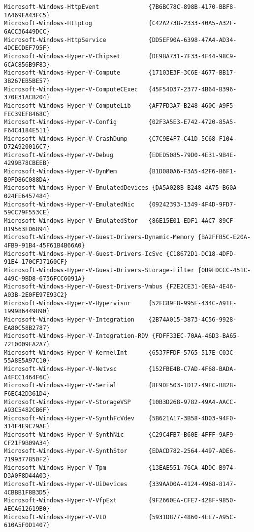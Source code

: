 \documentclass{report}
\begin{document}
\begin{lstlisting}[breaklines=true,basicstyle=\tiny]
Microsoft-Windows-HttpEvent              {7B6BC78C-898B-4170-BBF8-1A469EA43FC5}
Microsoft-Windows-HttpLog                {C42A2738-2333-40A5-A32F-6ACC36449DCC}
Microsoft-Windows-HttpService            {DD5EF90A-6398-47A4-AD34-4DCECDEF795F}
Microsoft-Windows-Hyper-V-Chipset        {DE9BA731-7F33-4F44-98C9-6CAC856B9F83}
Microsoft-Windows-Hyper-V-Compute        {17103E3F-3C6E-4677-BB17-3B267EB5BE57}
Microsoft-Windows-Hyper-V-ComputeCExec   {45F54D37-2377-4B64-B396-370E31ACB204}
Microsoft-Windows-Hyper-V-ComputeLib     {AF7FD3A7-B248-460C-A9F5-FEC39EF8468C}
Microsoft-Windows-Hyper-V-Config         {02F3A5E3-E742-4720-85A5-F64C4184E511}
Microsoft-Windows-Hyper-V-CrashDump      {C7C9E4F7-C41D-5C68-F104-D72A920016C7}
Microsoft-Windows-Hyper-V-Debug          {EDED5085-79D0-4E31-9B4E-4299B78CBEEB}
Microsoft-Windows-Hyper-V-DynMem         {B1D080A6-F3A5-42F6-B6F1-B9FD86C088DA}
Microsoft-Windows-Hyper-V-EmulatedDevices {DA5A028B-B248-4A75-B60A-024FE6457484}
Microsoft-Windows-Hyper-V-EmulatedNic    {09242393-1349-4F4D-9FD7-59CC79F553CE}
Microsoft-Windows-Hyper-V-EmulatedStor   {86E15E01-EDF1-4AC7-89CF-B19563FD6894}
Microsoft-Windows-Hyper-V-Guest-Drivers-Dynamic-Memory {BA2FFB5C-E20A-4FB9-91B4-45F61B4B66A0}
Microsoft-Windows-Hyper-V-Guest-Drivers-IcSvc {C18672D1-DC18-4DFD-91E4-170CF37160CF}
Microsoft-Windows-Hyper-V-Guest-Drivers-Storage-Filter {0B9FDCCC-451C-449C-9BD8-6756FCC6091A}
Microsoft-Windows-Hyper-V-Guest-Drivers-Vmbus {F2E2CE31-0E8A-4E46-A03B-2E0FE97E93C2}
Microsoft-Windows-Hyper-V-Hypervisor     {52FC89F8-995E-434C-A91E-199986449890}
Microsoft-Windows-Hyper-V-Integration    {2B74A015-3873-4C56-9928-EA80C58B2787}
Microsoft-Windows-Hyper-V-Integration-RDV {FDFF33EC-70AA-46D3-BA65-7210009FA2A7}
Microsoft-Windows-Hyper-V-KernelInt      {6537FFDF-5765-517E-C03C-55A8E5A97C10}
Microsoft-Windows-Hyper-V-Netvsc         {152FBE4B-C7AD-4F68-BADA-A4FCC1464F6C}
Microsoft-Windows-Hyper-V-Serial         {8F9DF503-1D12-49EC-BB28-F6EC42D361D4}
Microsoft-Windows-Hyper-V-StorageVSP     {10B3D268-9782-49A4-AACC-A93C5482CB6F}
Microsoft-Windows-Hyper-V-SynthFcVdev    {5B621A17-3B58-4D03-94F0-314F4E9C79AE}
Microsoft-Windows-Hyper-V-SynthNic       {C29C4FB7-B60E-4FFF-9AF9-CF21F9B09A34}
Microsoft-Windows-Hyper-V-SynthStor      {EDACD782-2564-4497-ADE6-7199377850F2}
Microsoft-Windows-Hyper-V-Tpm            {13EAE551-76CA-4DDC-B974-D3A0F8D44A03}
Microsoft-Windows-Hyper-V-UiDevices      {339AAD0A-4124-4968-8147-4CBBB1F8B3D5}
Microsoft-Windows-Hyper-V-VfpExt         {9F2660EA-CFE7-428F-9850-AECA612619B0}
Microsoft-Windows-Hyper-V-VID            {5931D877-4860-4EE7-A95C-610A5F0D1407}

\end{lstlisting}
\end{document}
